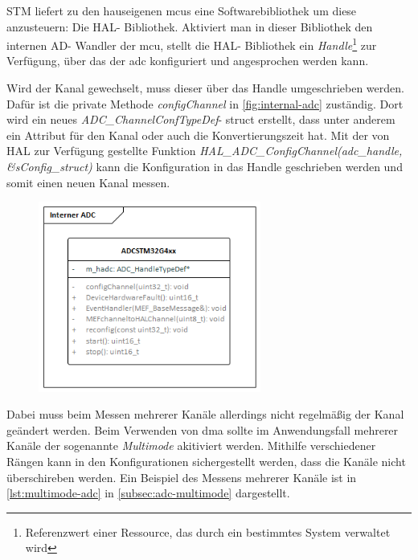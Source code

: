 STM liefert zu den hauseigenen \ac{mcu}s eine Softwarebibliothek um diese anzusteuern: Die HAL- Bibliothek.
Aktiviert man in dieser Bibliothek den internen AD- Wandler der \ac{mcu}, stellt die HAL- Bibliothek ein \textit{Handle}\footnote{ Referenzwert einer Ressource, das durch ein bestimmtes System verwaltet wird} zur Verfügung, über das der \ac{adc} konfiguriert und angesprochen werden kann.

Wird der Kanal gewechselt, muss dieser über das Handle umgeschrieben werden.
Dafür ist die private Methode \textit{configChannel} in \autoref{fig:internal-adc} zuständig.\newline
Dort wird ein neues \textit{ADC\_ChannelConfTypeDef}- struct erstellt, dass unter anderem ein Attribut für den Kanal oder auch die Konvertierungszeit hat.
Mit der von HAL zur Verfügung gestellte Funktion \textit{HAL\_ADC\_ConfigChannel(adc\_handle, \&sConfig\_struct)} kann die Konfiguration in das Handle geschrieben werden und somit einen neuen Kanal messen.

\begin{figure}[!htb]
    \begin{center}
        \includegraphics[width=0.65\textwidth]{Figures/Chapter_3/Interner ADC.png}
        
        \label{fig:internal-adc}
    \end {center}
\end{figure}

Dabei muss beim Messen mehrerer Kanäle allerdings nicht regelmäßig der Kanal geändert werden.
Beim Verwenden von \ac{dma} sollte im Anwendungsfall mehrerer Kanäle der sogenannte \textit{Multimode} akitiviert werden.
Mithilfe verschiedener Rängen kann in den Konfigurationen sichergestellt werden, dass die Kanäle nicht überschireben werden.
Ein Beispiel des Messens mehrerer Kanäle ist in \autoref{lst:multimode-adc} in \autoref{subsec:adc-multimode} dargestellt.

